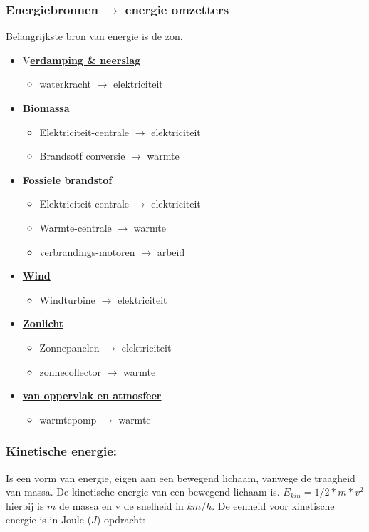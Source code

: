 \documentclass[12pt]{article}
\begin{document}
\subsubsection{\textbf{Energiebronnen $\rightarrow$ energie omzetters}}
Belangrijkste bron van energie is de zon.
\begin{itemize}
    \item V\textbf{\underline{erdamping \& neerslag}}\begin{itemize}
        \item waterkracht $\rightarrow$ elektriciteit
    \end{itemize}
    \item \textbf{\underline{Biomassa}}\begin{itemize}
        \item Elektriciteit-centrale $\rightarrow$ elektriciteit
        \item Brandsotf conversie $\rightarrow$ warmte
    \end{itemize}
    \item \textbf{\underline{Fossiele brandstof}}\begin{itemize}
        \item Elektriciteit-centrale $\rightarrow$ elektriciteit
        \item Warmte-centrale $\rightarrow$ warmte
        \item verbrandings-motoren $\rightarrow$ arbeid
    \end{itemize}
    \item \textbf{\underline{Wind}}\begin{itemize}
        \item Windturbine $\rightarrow$ elektriciteit
    \end{itemize}
    \item \textbf{\underline{Zonlicht}}\begin{itemize}
        \item Zonnepanelen $\rightarrow$ elektriciteit
        \item zonnecollector $\rightarrow$ warmte 
    \end{itemize}
    \item \textbf{\underline{van oppervlak en atmosfeer}}\begin{itemize}
        \item warmtepomp $\rightarrow$ warmte
    \end{itemize}
\end{itemize}
\subsubsection{Kinetische energie:}
Is een vorm van energie, eigen aan een bewegend lichaam, vanwege de traagheid van massa. De kinetische energie van een bewegend lichaam is.
$E_{kin} = 1/2 * m * v^2$ hierbij is $m$ de massa en v de snelheid in $km/h$.\newline
De eenheid voor kinetische energie is  in Joule ($J$)
opdracht:
\end{document}
